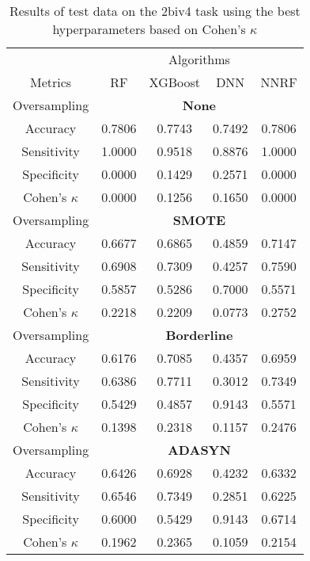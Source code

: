 \begin{table}[!htb]
\centering
\caption{Results of test data on the 2biv4 task using the best hyperparameters based on Cohen's $\kappa$}
\label{tab:2biv4_test_results}
\begin{tabular}{c | c c c c}
\hline
 & \multicolumn{4}{c}{Algorithms}\\ 
Metrics &RF & XGBoost & DNN & NNRF\\ 
\hline
Oversampling &\multicolumn{4}{|c}{\textbf{None}}\\ 
\hline
Accuracy & 0.7806 & 0.7743 & 0.7492 & 0.7806\\ 
Sensitivity & 1.0000 & 0.9518 & 0.8876 & 1.0000\\ 
Specificity & 0.0000 & 0.1429 & 0.2571 & 0.0000\\ 
Cohen's $\kappa$ & 0.0000 & 0.1256 & 0.1650 & 0.0000\\ 
\hline
Oversampling &\multicolumn{4}{|c}{\textbf{SMOTE}}\\ 
\hline
Accuracy & 0.6677 & 0.6865 & 0.4859 & 0.7147\\ 
Sensitivity & 0.6908 & 0.7309 & 0.4257 & 0.7590\\ 
Specificity & 0.5857 & 0.5286 & 0.7000 & 0.5571\\ 
Cohen's $\kappa$ & 0.2218 & 0.2209 & 0.0773 & 0.2752\\ 
\hline
Oversampling &\multicolumn{4}{|c}{\textbf{Borderline}}\\ 
\hline
Accuracy & 0.6176 & 0.7085 & 0.4357 & 0.6959\\ 
Sensitivity & 0.6386 & 0.7711 & 0.3012 & 0.7349\\ 
Specificity & 0.5429 & 0.4857 & 0.9143 & 0.5571\\ 
Cohen's $\kappa$ & 0.1398 & 0.2318 & 0.1157 & 0.2476\\ 
\hline
Oversampling &\multicolumn{4}{|c}{\textbf{ADASYN}}\\ 
\hline
Accuracy & 0.6426 & 0.6928 & 0.4232 & 0.6332\\ 
Sensitivity & 0.6546 & 0.7349 & 0.2851 & 0.6225\\ 
Specificity & 0.6000 & 0.5429 & 0.9143 & 0.6714\\ 
Cohen's $\kappa$ & 0.1962 & 0.2365 & 0.1059 & 0.2154\\ 
\hline
\end{tabular}
\end{table}

